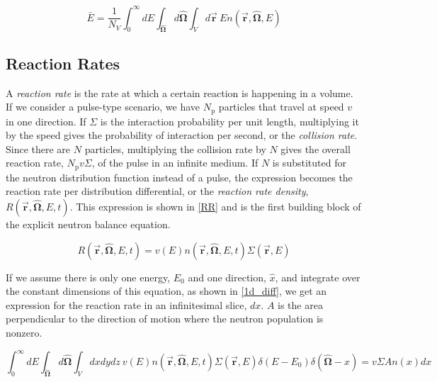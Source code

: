 \begin{equation}
\label{NDF_avg}
\bar{E} = \frac{1}{N_V } \int_0^\infty dE \int_{\boldsymbol{\hat{\Omega}}} d\boldsymbol{\hat{\Omega}}  \int_{V} d\boldsymbol{\vec{r}} \: E n(\boldsymbol{\vec{r}},\boldsymbol{\hat{\Omega}},E) 
\end{equation}

\subsection{Reaction Rates}

A \emph{reaction rate} is the rate at which a certain reaction is happening in a volume.  If we consider a pulse-type scenario, we have $N_\mathrm{p}$ particles that travel at speed $v$ in one direction.  If $\Sigma$ is the interaction probability per unit length, multiplying it by the speed gives the probability of interaction per second, or the \emph{collision rate}.  Since there are $N$ particles, multiplying the collision rate by $N$ gives the overall reaction rate, $N_\mathrm{p} v \Sigma$, of the pulse in an infinite medium.  If $N$ is substituted for the neutron distribution function instead of a pulse, the expression becomes the reaction rate per distribution differential, or the \emph{reaction rate density}, $R(\boldsymbol{\vec{r}},\boldsymbol{\hat{\Omega}},E,t)$.  This expression is shown in \eqref{RR} and is the first building block of the explicit neutron balance equation.

\begin{equation}
\label{RR}
R(\boldsymbol{\vec{r}},\boldsymbol{\hat{\Omega}},E,t)  = v(E) n(\boldsymbol{\vec{r}},\boldsymbol{\hat{\Omega}},E,t) \Sigma(\boldsymbol{\vec{r}},E)
\end{equation}

If we assume there is only one energy, $E_0$ and one direction, $\hat{x}$, and integrate over the constant dimensions of this equation, as shown in \eqref{1d_diff}, we get an expression for the reaction rate in an infinitesimal slice, $dx$.  $A$ is the area perpendicular to the direction of motion where the neutron population is nonzero.


\begin{equation}
\label{1d_diff}
 \int_0^\infty dE \int_{\boldsymbol{\hat{\Omega}}} d\boldsymbol{\hat{\Omega}}  \int_{V} dx dy dz \:  v(E) n(\boldsymbol{\vec{r}},\boldsymbol{\hat{\Omega}},E,t) \Sigma(\boldsymbol{\vec{r}},E) \delta(E-E_0) \delta(\boldsymbol{\hat{\Omega}}-\hat{x})  = v \Sigma A n(x)dx 
\end{equation}

